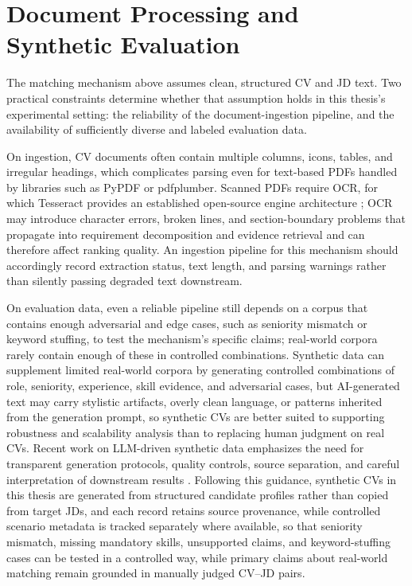 \documentclass[12pt,a4paper,oneside]{report}
\begin{document}
\section{Document Processing and Synthetic Evaluation}
The matching mechanism above assumes clean, structured CV and JD text. Two practical constraints determine whether that assumption holds in this thesis's experimental setting: the reliability of the document-ingestion pipeline, and the availability of sufficiently diverse and labeled evaluation data.

On ingestion, CV documents often contain multiple columns, icons, tables, and irregular headings, which complicates parsing even for text-based PDFs handled by libraries such as PyPDF or pdfplumber. Scanned PDFs require OCR, for which Tesseract provides an established open-source engine architecture \citep{smith2007tesseract}; OCR may introduce character errors, broken lines, and section-boundary problems that propagate into requirement decomposition and evidence retrieval and can therefore affect ranking quality. An ingestion pipeline for this mechanism should accordingly record extraction status, text length, and parsing warnings rather than silently passing degraded text downstream.

On evaluation data, even a reliable pipeline still depends on a corpus that contains enough adversarial and edge cases, such as seniority mismatch or keyword stuffing, to test the mechanism's specific claims; real-world corpora rarely contain enough of these in controlled combinations. Synthetic data can supplement limited real-world corpora by generating controlled combinations of role, seniority, experience, skill evidence, and adversarial cases, but AI-generated text may carry stylistic artifacts, overly clean language, or patterns inherited from the generation prompt, so synthetic CVs are better suited to supporting robustness and scalability analysis than to replacing human judgment on real CVs. Recent work on LLM-driven synthetic data emphasizes the need for transparent generation protocols, quality controls, source separation, and careful interpretation of downstream results \citep{long2024synthetic,tan2024annotation}. Following this guidance, synthetic CVs in this thesis are generated from structured candidate profiles rather than copied from target JDs, and each record retains source provenance, while controlled scenario metadata is tracked separately where available, so that seniority mismatch, missing mandatory skills, unsupported claims, and keyword-stuffing cases can be tested in a controlled way, while primary claims about real-world matching remain grounded in manually judged CV--JD pairs.
\end{document}
